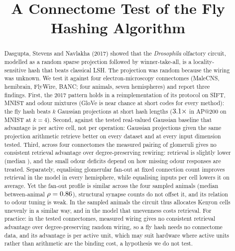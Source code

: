 \documentclass[conference]{IEEEtran}
\begin{document}
\title{A Connectome Test of the Fly Hashing Algorithm}

\author{
}

\maketitle

\begin{abstract}
Dasgupta, Stevens and Navlakha (2017) showed that the \textit{Drosophila}
olfactory circuit, modelled as a random sparse projection followed by
winner-take-all, is a locality-sensitive hash that beats classical LSH. The
projection was random because the wiring was unknown. We test it against four
electron-microscopy connectomes (MaleCNS, hemibrain, FlyWire, BANC; four
animals, seven hemispheres) and report three findings. First, the 2017 pattern holds in a reimplementation of its protocol on SIFT, MNIST and odour mixtures (GloVe is near chance at short codes for every method): the fly hash beats $k$ Gaussian projections at short hash lengths
($3.1\times$ in AP@200 on MNIST at $k=4$). Second, against the tested real-valued Gaussian baseline that advantage is per
active cell, not per operation: Gaussian projections given the same projection
arithmetic retrieve better on every dataset and at every input dimension
tested. Third, across four connectomes the measured pairing of glomeruli gives
no consistent retrieval advantage over degree-preserving rewiring: retrieval
is slightly lower (median \AnimRelMedian{}), and the small odour deficits
depend on how missing odour responses are treated. Separately, equalising
glomerular fan-out at fixed connection count improves retrieval in the model in
every hemisphere, while equalising inputs per cell lowers it on average. Yet the fan-out profile is similar across the four sampled animals (median between-animal $\rho=0.86$), structural synapse counts do not offset it, and its relation to odour tuning is weak. In the sampled animals the circuit thus allocates Kenyon cells unevenly in a similar way, and in the model that unevenness costs retrieval. For practice: in the tested connectomes, measured wiring gives no consistent retrieval advantage over degree-preserving random wiring, so a fly hash needs no connectome data, and its advantage is per active unit, which may suit hardware where active units rather than arithmetic are the binding cost, a hypothesis we do not test.
\end{abstract}
\end{document}
